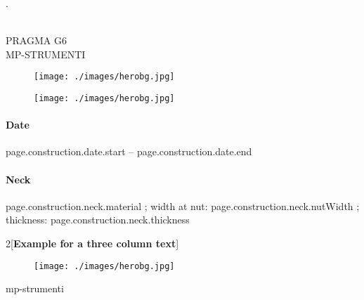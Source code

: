 \documentclass{report}
\begin{document}
\pagecolor{myBlack1}

\begin{center}
{.}\\
\vspace{36pt}
\\
    \textcolor{mySand}{       
        \Large PRAGMA G6\\
        \footnotesize MP-STRUMENTI
    }
\vspace{64pt}
    \begin{figure}[h!]
  \texttt{[image: ./images/herobg.jpg]}
\end{figure}
\end{center}

\newpage
\pagecolor{white}

    \begin{figure}[h!]
  \texttt{[image: ./images/herobg.jpg]}
\end{figure}



\paragraph{Date}

{{page.construction.date.start}} --
{{page.construction.date.end}}

\paragraph{Neck}
            {{ page.construction.neck.material }}
            ; width at nut:
            {{ page.construction.neck.nutWidth }}
            ; thickness:
            {{ page.construction.neck.thickness }}
    


\newpage
\pagecolor{white}


  \begin{multicols}{2}[\textbf{Example for a three column text}]
    \footnotesize\blindtext
  \end{multicols}
\vfill

    \begin{figure}[h!]
  \texttt{[image: ./images/herobg.jpg]}
\end{figure}

\newpage
\pagecolor{white}


\vfill

\begin{center}
mp-strumenti
\end{center}


\newpage


\newpage
\end{document}
